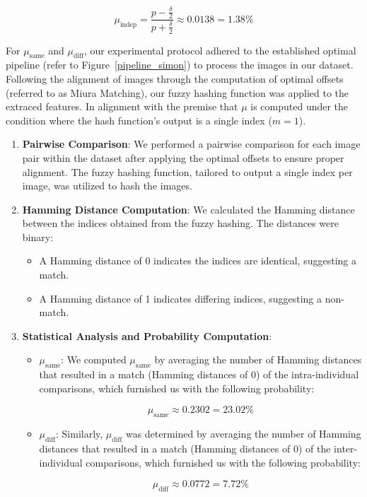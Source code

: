 \[
    \mu_{\text{indep}} = \frac{p - \frac{\delta}{2}}{p + \frac{\delta}{2}} \approx 0.0138 = 1.38\%
\]

For \(\mu_{\text{same}}\) and \(\mu_{\text{diff}}\), our experimental protocol adhered to the established optimal pipeline (refer to Figure~\ref{pipeline_simon}) to process the images in our dataset. Following the alignment of images through the computation of optimal offsets (referred to as Miura Matching), our fuzzy hashing function was applied to the extraced features. In alignment with the premise that \(\mu\) is computed under the condition where the hash function's output is a single index (\(m=1\)).

\begin{enumerate}
    \item \textbf{Pairwise Comparison}: We performed a pairwise comparison for each image pair within the dataset after applying the optimal offsets to ensure proper alignment. The fuzzy hashing function, tailored to output a single index per image, was utilized to hash the images.

    \item \textbf{Hamming Distance Computation}: We calculated the Hamming distance between the indices obtained from the fuzzy hashing. The distances were binary:
    \begin{itemize}
        \item A Hamming distance of 0 indicates the indices are identical, suggesting a match.
        \item A Hamming distance of 1 indicates differing indices, suggesting a non-match.
    \end{itemize}
    
    \item \textbf{Statistical Analysis and Probability Computation}:
    \begin{itemize}
        \item \textbf{\(\mu_{\text{same}}\)}: We computed \(\mu_{\text{same}}\) by averaging the number of Hamming distances that resulted in a match (Hamming distances of 0) of the intra-individual comparisons, which furnished us with the following probability:

        \[ \mu_{\text{same}} \approx 0.2302 = 23.02\%\] 
        
        \item \textbf{\(\mu_{\text{diff}}\)}: Similarly, \(\mu_{\text{diff}}\) was determined by averaging the number of Hamming distances that resulted in a match (Hamming distances of 0) of the inter-individual comparisons, which furnished us with the following probability:

        \[ \mu_{\text{diff}} \approx 0.0772 = 7.72\% \]
    \end{itemize}
\end{enumerate}

